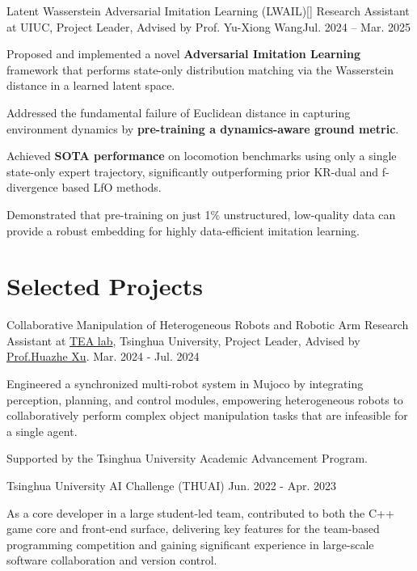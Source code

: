   \resumeSubheading
    {{Latent Wasserstein Adversarial Imitation Learning (LWAIL)}}{[\href{https://github.com/JackyYang258/LWAIL}{\textcolor{darkblue}{\faGithub}}]}
    {Research Assistant at UIUC, Project Leader, Advised by Prof. Yu-Xiong Wang}{Jul. 2024 -- Mar. 2025}
    \resumeItemListStart
    \item {Proposed and implemented a novel \textbf{Adversarial Imitation Learning} framework that performs state-only distribution matching via the Wasserstein distance in a learned latent space.}
    \item {Addressed the fundamental failure of Euclidean distance in capturing environment dynamics by \textbf{pre-training a dynamics-aware ground metric}.}
    \item {Achieved \textbf{SOTA performance} on locomotion benchmarks using only a single state-only expert trajectory, significantly outperforming prior KR-dual and f-divergence based LfO methods.}
    \item {Demonstrated that pre-training on just 1\% unstructured, low-quality data can provide a robust embedding for highly data-efficient imitation learning.}
    \resumeItemListEnd
  
\resumeSubHeadingListEnd
\vspace{-6mm}



\section{\textbf{Selected Projects}}
\vspace{-0.4mm}

\resumeSubHeadingListStart

\resumeProject
    {Collaborative Manipulation of Heterogeneous Robots and Robotic Arm}
  {Research Assistant at \href{https://github.com/TEA-Lab}{TEA lab}, Tsinghua University, Project Leader, Advised by \href{http://hxu.rocks/}{Prof.Huazhe Xu}.}
  {Mar. 2024 - Jul. 2024}
  {}
  \resumeItemListStart
  \item Engineered a synchronized multi-robot system in Mujoco by integrating perception, planning, and control modules, empowering heterogeneous robots to collaboratively perform complex object manipulation tasks that are infeasible for a single agent.
  \item Supported by the Tsinghua University Academic Advancement Program.
  \resumeItemListEnd 



\resumeProject
  {Tsinghua University AI Challenge (THUAI)}
  {\vspace{-2mm}}
  {Jun. 2022 - Apr. 2023}
  {{\vspace{-2mm}}}
    \resumeItemListStart
      \item As a core developer in a large student-led team, contributed to both the C++ game core and front-end surface, delivering key features for the team-based programming competition and gaining significant experience in large-scale software collaboration and version control.
    \resumeItemListEnd

